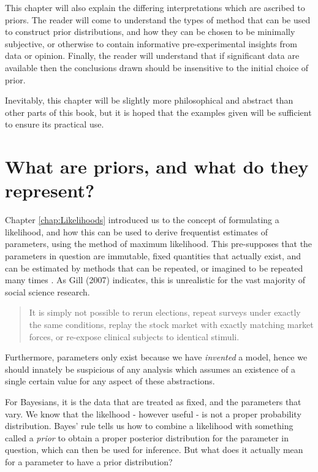 \documentclass[11pt,fullpage]{book}
\begin{document}
This chapter will also explain the differing interpretations which are ascribed to priors. The reader will come to understand the types of method that can be used to construct prior distributions, and how they can be chosen to be minimally subjective, or otherwise to contain informative pre-experimental insights from data or opinion. Finally, the reader will understand that if significant data are available then the conclusions drawn should be insensitive to the initial choice of prior.

Inevitably, this chapter will be slightly more philosophical and abstract than other parts of this book, but it is hoped that the examples given will be sufficient to ensure its practical use.

\section{What are priors, and what do they represent?}
Chapter \ref{chap:Likelihoods} introduced us to the concept of formulating a likelihood, and how this can be used to derive frequentist estimates of parameters, using the method of maximum likelihood. This pre-supposes that the parameters in question are immutable, fixed quantities that actually exist, and can be estimated by methods that can be repeated, or imagined to be repeated many times \cite{gill2007bayesian}. As Gill (2007) indicates, this is unrealistic for the vast majority of social science research.

\begin{quotation}
It is simply not possible to rerun elections, repeat surveys under exactly the same conditions, replay the stock market with exactly matching market forces, or re-expose clinical subjects to identical stimuli.
\end{quotation}

Furthermore, parameters only exist because we have \textit{invented} a model, hence we should innately be suspicious of any analysis which assumes an existence of a single certain value for any aspect of these abstractions.

For Bayesians, it is the data that are treated as fixed, and the parameters that vary. We know that the likelhood - however useful - is not a proper probability distribution. Bayes' rule tells us how to combine a likelihood with something called a \textit{prior} to obtain a proper posterior distribution for the parameter in question, which can then be used for inference. But what does it actually mean for a parameter to have a prior distribution?
\end{document}

